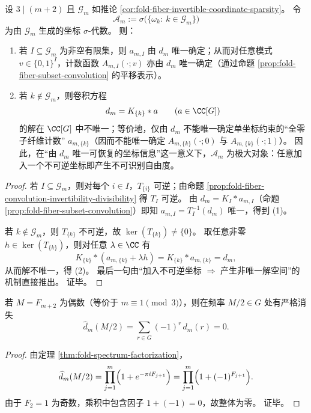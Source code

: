 \begin{theorem}[偶模长下的可恢复信息极大性]\label{thm:fold-fiber-identifiable-sigma-algebra-maximal}
设 \(3\mid (m+2)\) 且 \(\mathcal G_m\) 如推论 \ref{cor:fold-fiber-invertible-coordinate-sparsity}。
令
\[
\mathscr A_m:=\sigma\bigl(\{\omega_k:\ k\in\mathcal G_m\}\bigr)
\]
为由 \(\mathcal G_m\) 生成的坐标 \(\sigma\)-代数。
则：
\begin{enumerate}
\normalfont
  \item 若 \(I\subseteq \mathcal G_m\) 为非空有限集，则 \(a_{m,I}\) 由 \(d_m\) 唯一确定；从而对任意模式 \(v\in\{0,1\}^I\)，计数函数 \(A_{m,I}(\cdot;v)\) 亦由 \(d_m\) 唯一确定（通过命题 \ref{prop:fold-fiber-subset-convolution} 的平移表示）。
  \item 若 \(k\notin \mathcal G_m\)，则卷积方程
  \[
  d_m=K_{\{k\}}*a
  \qquad (a\in \CC[G])
  \]
  的解在 \(\CC[G]\) 中不唯一；等价地，仅由 \(d_m\) 不能唯一确定单坐标约束的“全零子纤维计数” \(a_{m,\{k\}}\)（因而不能唯一确定 \(A_{m,\{k\}}(\cdot;0)\) 与 \(A_{m,\{k\}}(\cdot;1)\)）。
  因此，在“由 \(d_m\) 唯一可恢复的坐标信息”这一意义下，\(\mathscr A_m\) 为极大对象：任意加入一个不可逆坐标即产生不可识别自由度。
\end{enumerate}
\end{theorem}
\begin{proof}
若 \(I\subseteq\mathcal G_m\)，则对每个 \(i\in I\)，\(T_{\{i\}}\) 可逆；由命题 \ref{prop:fold-fiber-convolution-invertibility-divisibility} 得 \(T_I\) 可逆。
由 \(d_m=K_I*a_{m,I}\)（命题 \ref{prop:fold-fiber-subset-convolution}）即知 \(a_{m,I}=T_I^{-1}(d_m)\) 唯一，得到 (1)。

若 \(k\notin\mathcal G_m\)，则 \(T_{\{k\}}\) 不可逆，故 \(\ker(T_{\{k\}})\neq\{0\}\)。
取任意非零 \(h\in\ker(T_{\{k\}})\)，则对任意 \(\lambda\in\CC\) 有
\[
K_{\{k\}}*(a_{m,\{k\}}+\lambda h)=K_{\{k\}}*a_{m,\{k\}}=d_m,
\]
从而解不唯一，得 (2)。
最后一句由“加入不可逆坐标 \(\Rightarrow\) 产生非唯一解空间”的机制直接推出。
证毕。
\end{proof}

\begin{proposition}[偶模长的谱盲点]\label{prop:fold-multiplicity-spectrum-blindspot-half}
若 \(M=F_{m+2}\) 为偶数（等价于 \(m\equiv 1\pmod 3\)），则在频率 \(M/2\in G\) 处有严格消失
\[
\widehat d_m(M/2)=\sum_{r\in G}(-1)^r\,d_m(r)=0.
\]
\end{proposition}
\begin{proof}
由定理 \ref{thm:fold-spectrum-factorization}，
\[
\widehat d_m(M/2)=\prod_{j=1}^{m}\Bigl(1+e^{-\pi i F_{j+1}}\Bigr)
=\prod_{j=1}^{m}\Bigl(1+(-1)^{F_{j+1}}\Bigr).
\]
由于 \(F_2=1\) 为奇数，乘积中包含因子 \(1+(-1)=0\)，故整体为零。
证毕。
\end{proof}

